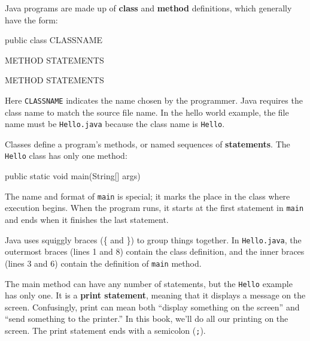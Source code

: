 \documentclass[12pt]{book}
\theoremstyle{exercise}
\newcommand{\java}[1]{\verb"#1"}
\newcommand{\java}[1]{\lstinline{#1}} %
\begin{document}
Java programs are made up of {\bf class} and {\bf method} definitions, which generally have the form:

\begin{code}
public class CLASSNAME {

    METHOD {
        STATEMENTS
    }

    METHOD {
        STATEMENTS
    }

}
\end{code}


Here \java{CLASSNAME} indicates the name chosen by the programmer.
Java requires the class name to match the source file name.
In the hello world example, the file name must be {\tt Hello.java} because the class name is \java{Hello}.


Classes define a program's methods, or named sequences of {\bf statements}.
The \java{Hello} class has only one method:

\begin{code}
    public static void main(String[] args)
\end{code}

The name and format of \java{main} is special; it marks the place in the class where execution begins.
When the program runs, it starts at the first statement in \java{main} and ends when it finishes the last statement.


Java uses squiggly braces (\{ and \}) to group things together.
In {\tt Hello.java}, the outermost braces (lines 1 and 8) contain the class definition, and the inner braces (lines 3 and 6) contain the definition of \java{main} method.



The main method can have any number of statements, but the \java{Hello} example has only one.
It is a {\bf print statement}, meaning that it displays a message on the screen.
Confusingly, print can mean both ``display something on the screen'' and ``send something to the printer.''
In this book, we'll do all our printing on the screen.
The print statement ends with a semicolon (\java{;}).
\end{document}
